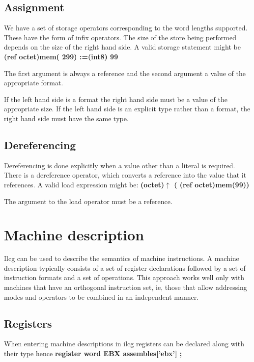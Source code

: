 {{\subsection{Assignment }

We have a set of storage operators corresponding to the word lengths
supported. These have the form of infix operators. The size of the
store being performed depends on the size of the right hand side.
A valid storage statement might be \textbf{(ref octet)mem( 299) :=(int8)
99}

The first argument is always a reference and the second argument a
value of the appropriate format.

If the left hand side is a format the right hand side must be a value
of the appropriate size. If the left hand side is an explicit type
rather than a format, the right hand side must have the same type. 


\subsection{Dereferencing}

Dereferencing is done explicitly when a value other than a literal
is required. There is a dereference operator, which converts a reference
into the value that it references. A valid load expression might be:
\textbf{(octet)$\uparrow $ ( (ref octet)mem(99))}

The argument to the load operator must be a reference.


\section{Machine description}

Ilcg can be used to describe the semantics of machine instructions.
A machine description typically consists of a set of register declarations
followed by a set of instruction formats and a set of operations.
This approach works well only with machines that have an orthogonal
instruction set, ie, those that allow addressing modes and operators
to be combined in an independent manner. 


\subsection{Registers }

When entering machine descriptions in ilcg registers can be declared
along with their type hence \textbf{register word EBX assembles{[}'ebx'{]}
;}

}}
